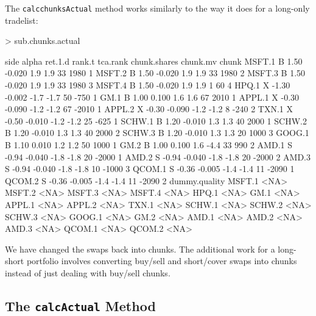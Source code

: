 \documentclass{article}
\begin{document}
The \texttt{calcchunksActual} method works similarly to the way it
does for a long-only tradelist:


\begin{Schunk}
\begin{Sinput}
> sub.chunks.actual
\end{Sinput}
\begin{Soutput}
       side alpha ret.1.d rank.t tca.rank chunk.shares chunk.mv chunk
MSFT.1    B  1.50  -0.020    1.9      1.9           33     1980     1
MSFT.2    B  1.50  -0.020    1.9      1.9           33     1980     2
MSFT.3    B  1.50  -0.020    1.9      1.9           33     1980     3
MSFT.4    B  1.50  -0.020    1.9      1.9            1       60     4
HPQ.1     X -1.30  -0.002   -1.7     -1.7           50     -750     1
GM.1      B  1.00   0.100    1.6      1.6           67     2010     1
APPL.1    X -0.30  -0.090   -1.2     -1.2           67    -2010     1
APPL.2    X -0.30  -0.090   -1.2     -1.2            8     -240     2
TXN.1     X -0.50  -0.010   -1.2     -1.2           25     -625     1
SCHW.1    B  1.20  -0.010    1.3      1.3           40     2000     1
SCHW.2    B  1.20  -0.010    1.3      1.3           40     2000     2
SCHW.3    B  1.20  -0.010    1.3      1.3           20     1000     3
GOOG.1    B  1.10   0.010    1.2      1.2           50     1000     1
GM.2      B  1.00   0.100    1.6     -4.4           33      990     2
AMD.1     S -0.94  -0.040   -1.8     -1.8           20    -2000     1
AMD.2     S -0.94  -0.040   -1.8     -1.8           20    -2000     2
AMD.3     S -0.94  -0.040   -1.8     -1.8           10    -1000     3
QCOM.1    S -0.36  -0.005   -1.4     -1.4           11    -2090     1
QCOM.2    S -0.36  -0.005   -1.4     -1.4           11    -2090     2
       dummy.quality
MSFT.1          <NA>
MSFT.2          <NA>
MSFT.3          <NA>
MSFT.4          <NA>
HPQ.1           <NA>
GM.1            <NA>
APPL.1          <NA>
APPL.2          <NA>
TXN.1           <NA>
SCHW.1          <NA>
SCHW.2          <NA>
SCHW.3          <NA>
GOOG.1          <NA>
GM.2            <NA>
AMD.1           <NA>
AMD.2           <NA>
AMD.3           <NA>
QCOM.1          <NA>
QCOM.2          <NA>
\end{Soutput}
\end{Schunk}

We have changed the swaps back into chunks.  The additional work for a
long-short portfolio involves converting buy/sell and short/cover
swaps into chunks instead of just dealing with buy/sell chunks.

\subsection{The \texttt{calcActual} Method}
\end{document}
